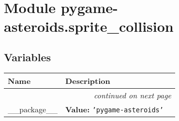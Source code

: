 %
%
%


\section{Module pygame-asteroids.sprite\_collision}

    \label{pygame-asteroids:sprite_collision}


  \subsection{Variables}

    \vspace{-1cm}
\hspace{\varindent}\begin{longtable}{|p{\varnamewidth}|p{\vardescrwidth}|l}
\cline{1-2}
\cline{1-2} \centering \textbf{Name} & \centering \textbf{Description}& \\
\cline{1-2}
\endhead\cline{1-2}\multicolumn{3}{r}{\small\textit{continued on next page}}\\\endfoot\cline{1-2}
\endlastfoot\raggedright \_\-\_\-p\-a\-c\-k\-a\-g\-e\-\_\-\_\- & \raggedright \textbf{Value:} 
{\tt \texttt{'}\texttt{pygame-asteroids}\texttt{'}}&\\
\cline{1-2}
\end{longtable}



